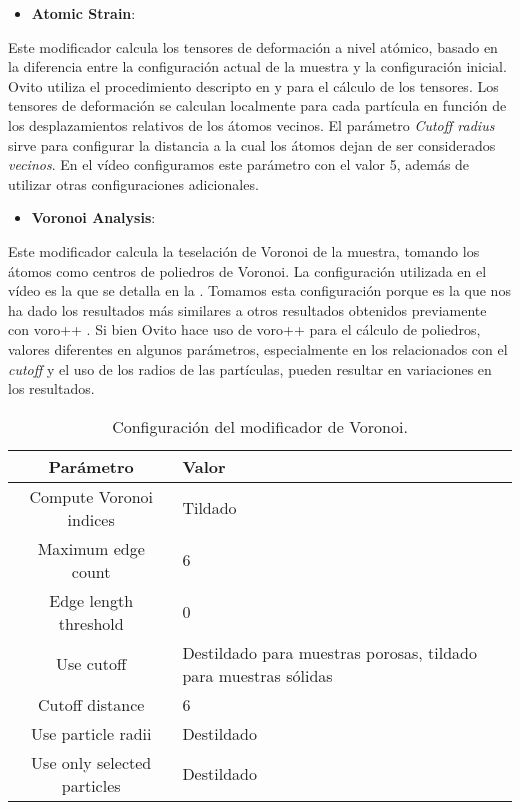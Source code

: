 \begin{itemize}
 \item \textbf{Atomic Strain}:
\end{itemize}
Este modificador calcula los tensores de deformación a nivel atómico, basado en la diferencia entre la configuración actual de la muestra y la configuración inicial. Ovito utiliza el procedimiento descripto en \cite{shimizu07} y \cite{Falk98} para el cálculo de los tensores. Los tensores de deformación se calculan localmente para cada partícula en función de los desplazamientos relativos de los átomos vecinos. El parámetro \textit{Cutoff radius} sirve para configurar la distancia a la cual los átomos dejan de ser considerados \textit{vecinos}. En el vídeo configuramos este parámetro con el valor 5, además de utilizar otras configuraciones adicionales.

\begin{itemize}
 \item \textbf{Voronoi Analysis}:
\end{itemize}
Este modificador calcula la teselación de Voronoi de la muestra, tomando los átomos como centros de poliedros de Voronoi. La configuración utilizada en el vídeo es la que se detalla en la . Tomamos esta configuración porque es la que nos ha dado los resultados más similares a otros resultados obtenidos previamente con voro++ \citep{Rycroft09}. Si bien Ovito hace uso de voro++ para el cálculo de poliedros, valores diferentes en algunos parámetros, especialmente en los relacionados con el \textit{cutoff} y el uso de los radios de las partículas, pueden resultar en variaciones en los resultados.

\begin{table}[htp]
\begin{center}
\begin{tabular}{c C{6cm}}
\hline
Parámetro & Valor \\ \hline \hline
Compute Voronoi indices & Tildado \\ \hline
Maximum edge count & 6 \\ \hline
Edge length threshold & 0 \\ \hline
Use cutoff & Destildado para muestras porosas, tildado para muestras sólidas \\ \hline
Cutoff distance & 6 \\ \hline
Use particle radii & Destildado \\ \hline
Use only selected particles & Destildado \\ \hline
\end{tabular}
\end{center}
\caption[Configuración del modificador de Voronoi]{Configuración del modificador de Voronoi.}
\label{AB:tbl:conf}
\end{table}

